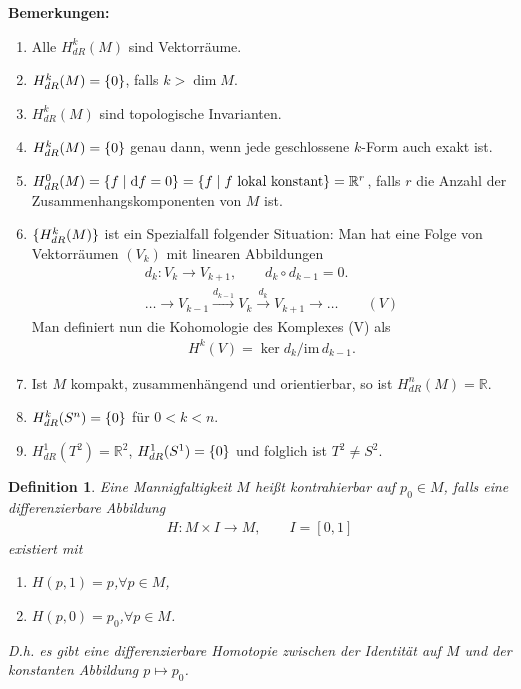 \documentclass[12pt,a4paper]{article}
\def\R{\mathbb{R}}
\def\im{\mathrm{im}\,}
\newtheorem{Definition}[Lemma]{Definition}
\begin{document}
\bigskip

{\bf Bemerkungen:}
\begin{enumerate}
  \item Alle $H_{dR}^k(M)$ sind Vektorr\"aume.
  \item $H_{dR}^k(M) = \{0\}$, falls $k> \dim M$.
  \item $H_{dR}^k(M)$ sind topologische Invarianten.
  \item $H_{dR}^k(M) = \{0\}$ genau dann, wenn jede geschlossene $k$-Form
  auch exakt ist.
  \item $H_{dR}^0(M) = \setdef{f}{\df=0} = \setdef{f}{f\text{ lokal konstant}}
  = \R^r$, falls $r$ die Anzahl der Zusammenhangskomponenten von $M$ ist.
  \item $\{H_{dR}^k(M)\}$ ist ein Spezialfall folgender Situation: Man hat
  eine Folge von Vektorr\"aumen $(V_k)$ mit linearen Abbildungen
  \begin{align*}
  d_k: V_k\to V_{k+1},\qquad d_k\circ d_{k-1} = 0.\\
  \ldots \longrightarrow V_{k-1}\overset{d_{k-1}}{\longrightarrow} V_k
  \overset{d_{k}}{\longrightarrow} V_{k+1}\longrightarrow \ldots\qquad (V)
  \end{align*}
  Man definiert nun die Kohomologie des Komplexes (V) als
  \begin{align*}
  H^k(V) = \ker d_k/\im d_{k-1}.
  \end{align*}
  \item Ist $M$ kompakt, zusammenh\"angend und orientierbar, so ist $H_{dR}^n(M)
  = \R$.
  \item $H_{dR}^k(S^n) = \{0\}$ f\"ur $0<k<n$.
  \item $H_{dR}^1(T^2) = \R^2$, $H_{dR}^1(S^1) = \{0\}$ und folglich ist
  $T^2\neq S^2$.
\end{enumerate}

\bigskip

\begin{Definition}
Eine Mannigfaltigkeit $M$ hei\ss{}t \emph{kontrahierbar} auf $p_0\in M$, falls eine
differenzierbare Abbildung 
\begin{align*}
H: M\times I\to M,\qquad I =[0,1]
\end{align*}
existiert mit
\begin{enumerate}
  \item $H(p,1) = p$,\qquad $\forall p\in M$,
  \item $H(p,0) = p_0$,\qquad $\forall p\in M$. 
\end{enumerate}
D.h. es gibt eine differenzierbare Homotopie zwischen der Identit\"at auf $M$ und
der konstanten Abbildung $p\mapsto p_0$.
\end{Definition}
\end{document}
